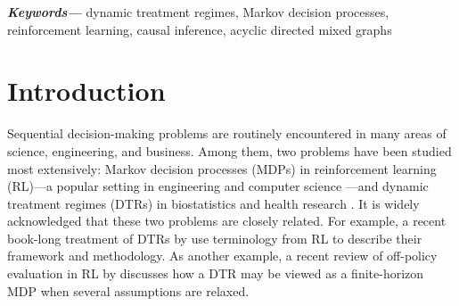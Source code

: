 \documentclass[12pt,a4paper]{article}
\theoremstyle{definition}
\providecommand{\keywords}[1]
{
  \textbf{\textit{Keywords---}} #1
}
\begin{document}
\begin{abstract}

\end{abstract}

\keywords{dynamic treatment regimes, Markov decision processes,
  reinforcement learning, causal inference, acyclic directed mixed
  graphs}

\section{Introduction}\label{sec:introduction}


Sequential decision-making problems are routinely encountered in
many areas of science, engineering, and business. Among them, two
problems have been studied most extensively: Markov decision processes
(MDPs) in reinforcement learning (RL)---a popular setting in engineering
and computer science
\parencite{puterman_markov_2014,sutton_reinforcement_2018}---and dynamic
treatment regimes (DTRs) in biostatistics and health research
\parencite{murphy_optimal_2003,chakraborty_statistical_2013}. It
is widely acknowledged that
these two problems are closely related. For example, a recent
book-long treatment of DTRs by \textcite[page 187 and 574]{tsiatis_dynamic_2020} use
terminology from RL to describe their framework
and methodology. As another example, a recent review of off-policy evaluation in RL by
\textcite{uehara_review_2022} discusses how a DTR may be viewed as a finite-horizon MDP when several assumptions are relaxed.
\end{document}
